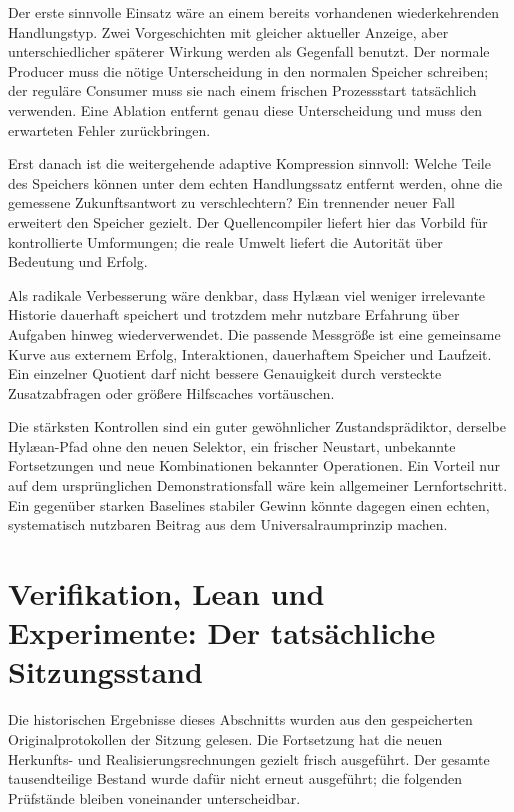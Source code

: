 Der erste sinnvolle Einsatz wäre an einem bereits vorhandenen wiederkehrenden Handlungstyp. Zwei Vorgeschichten mit gleicher aktueller Anzeige, aber unterschiedlicher späterer Wirkung werden als Gegenfall benutzt. Der normale Producer muss die nötige Unterscheidung in den normalen Speicher schreiben; der reguläre Consumer muss sie nach einem frischen Prozessstart tatsächlich verwenden. Eine Ablation entfernt genau diese Unterscheidung und muss den erwarteten Fehler zurückbringen.

Erst danach ist die weitergehende adaptive Kompression sinnvoll: Welche Teile des Speichers können unter dem echten Handlungssatz entfernt werden, ohne die gemessene Zukunftsantwort zu verschlechtern? Ein trennender neuer Fall erweitert den Speicher gezielt. Der Quellencompiler liefert hier das Vorbild für kontrollierte Umformungen; die reale Umwelt liefert die Autorität über Bedeutung und Erfolg.

Als radikale Verbesserung wäre denkbar, dass Hylæan viel weniger irrelevante Historie dauerhaft speichert und trotzdem mehr nutzbare Erfahrung über Aufgaben hinweg wiederverwendet. Die passende Messgröße ist eine gemeinsame Kurve aus externem Erfolg, Interaktionen, dauerhaftem Speicher und Laufzeit. Ein einzelner Quotient darf nicht bessere Genauigkeit durch versteckte Zusatzabfragen oder größere Hilfscaches vortäuschen.

Die stärksten Kontrollen sind ein guter gewöhnlicher Zustandsprädiktor, derselbe Hylæan-Pfad ohne den neuen Selektor, ein frischer Neustart, unbekannte Fortsetzungen und neue Kombinationen bekannter Operationen. Ein Vorteil nur auf dem ursprünglichen Demonstrationsfall wäre kein allgemeiner Lernfortschritt. Ein gegenüber starken Baselines stabiler Gewinn könnte dagegen einen echten, systematisch nutzbaren Beitrag aus dem Universalraumprinzip machen.

\section{Verifikation, Lean und Experimente: Der tatsächliche Sitzungsstand}\label{sec:verification}

Die historischen Ergebnisse dieses Abschnitts wurden aus den gespeicherten Originalprotokollen der Sitzung gelesen. Die Fortsetzung hat die neuen Herkunfts- und Realisierungsrechnungen gezielt frisch ausgeführt. Der gesamte tausendteilige Bestand wurde dafür nicht erneut ausgeführt; die folgenden Prüfstände bleiben voneinander unterscheidbar.

